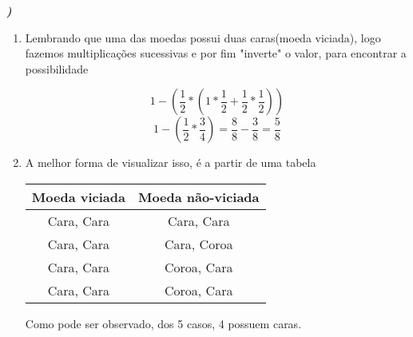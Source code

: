 \documentclass[12pt]{article}
\newcounter{instn}
\newcommand{\instnum}{\arabic{instn}}
\newcommand{\myline}[1]{
    \emph{\textbf{#1)}}
    \addtocounter{instn}{1}
}
\newenvironment{question}
 {
    \myline{\instnum} 
    }
    {
 }
\begin{document}

    \newpage 

    \begin{question}
        \begin{enumerate}[label={\textbf{\alph*)}}]
            \item Lembrando que uma das moedas possui duas caras(moeda viciada), logo 
            fazemos multiplicações sucessivas e por fim "inverte" o valor, para encontrar a possibilidade 

            \[
                1 - (\frac{1}{2}*(1 * \frac{1}{2} + \frac{1}{2} * \frac{1}{2}))   
            \]
            \begin{equation}
                1 - (\frac{1}{2} * \frac{3}{4}) = \frac{8}{8} - \frac{3}{8} = \frac{5}{8}
            \end{equation}
            \item 
            A melhor forma de visualizar isso, é a partir de uma tabela 
            \begin{center}
                \begin{tabular}{||c | c||} 
                \hline
                Moeda viciada & Moeda não-viciada \\ [0.5ex] 
                \hline\hline
                Cara, Cara & Cara, Cara \\ 
                \hline
                Cara, Cara & Cara, Coroa \\
                \hline
                Cara, Cara & Coroa, Cara \\
                \hline
                Cara, Cara & Coroa, Cara \\
                \hline
               \end{tabular}
            \end{center}
            Como pode ser observado, dos 5 casos, 4 possuem caras.
        \end{enumerate}
    \end{question}

\end{document}
